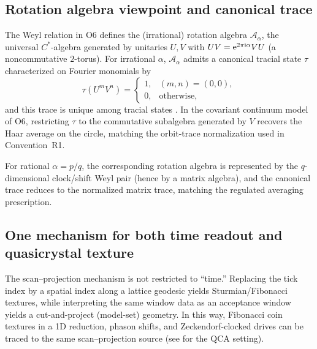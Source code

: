 \subsection{Rotation algebra viewpoint and canonical trace}
The Weyl relation in O6 defines the (irrational) rotation algebra $\mathcal{A}_{\alpha}$, the universal $C^{*}$-algebra generated by unitaries $U,V$ with $UV=\mathrm{e}^{2\pi \mathrm{i} \alpha}VU$ (a noncommutative $2$-torus). For irrational $\alpha$, $\mathcal{A}_{\alpha}$ admits a canonical tracial state $\tau$ characterized on Fourier monomials by
\begin{equation}
    \tau(U^{m}V^{n})=
    \begin{cases}
        1, & (m,n)=(0,0),\\
        0, & \text{otherwise},
    \end{cases}
\end{equation}
and this trace is unique among tracial states \cite{Rieffel1981,Connes1994}. In the covariant continuum model of O6, restricting $\tau$ to the commutative subalgebra generated by $V$ recovers the Haar average on the circle, matching the orbit-trace normalization used in Convention~R1.
\par
For rational $\alpha=p/q$, the corresponding rotation algebra is represented by the $q$-dimensional clock/shift Weyl pair (hence by a matrix algebra), and the canonical trace reduces to the normalized matrix trace, matching the regulated averaging prescription.

\subsection{One mechanism for both time readout and quasicrystal texture}
The scan--projection mechanism is not restricted to ``time.'' Replacing the tick index by a spatial index along a lattice geodesic yields Sturmian/Fibonacci textures, while interpreting the same window data as an acceptance window yields a cut-and-project (model-set) geometry. In this way, Fibonacci coin textures in a 1D reduction, phason shifts, and Zeckendorf-clocked drives can be traced to the same scan--projection source (see \cite{Ma2025FoP} for the QCA setting).

